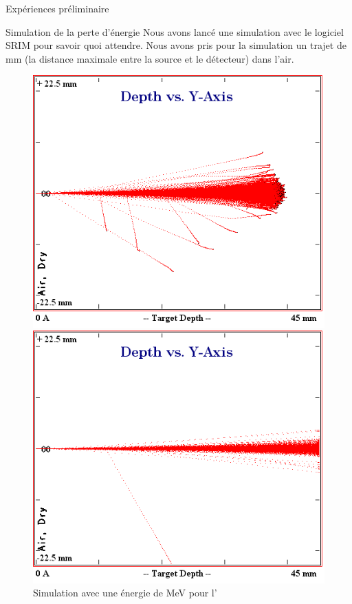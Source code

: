 \documentclass[a4paper,11pt,liststotocnumbered,bibtotocnumbered]{scrartcl}
\begin{document}
\begin{section}{Expériences préliminaire}
  \begin{subsection}{Simulation de la perte d'énergie}
   Nous avons lancé une simulation avec le logiciel \flqq SRIM \frqq \cite{srim} pour savoir quoi attendre. Nous avons pris pour la simulation un trajet de \unit[45]{mm} (la distance maximale entre la source et le détecteur) dans l'air.
   \begin{figure}[H]
    \begin{minipage}{0.45\textwidth}
     \includegraphics[width=\textwidth]{Bilder/simam.png}
     \caption{Simulation avec une énergie de \unit[5]{MeV} pour l'}
    \end{minipage}
    \hfill
    \begin{minipage}{0.45\textwidth}
     \includegraphics[width=\textwidth]{Bilder/simbi7MeV.png}

\end{minipage}
\end{figure}
\end{subsection}
\end{section}
\end{document}

